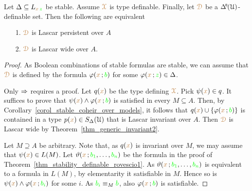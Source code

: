 \begin{corollary}\label{corol_persistent_finsat}
  Let $\Delta\subseteq L_{{\color{brown} x}\,{\color{green} z}}$ be stable.
  Assume ${\color{brown}\EuScript X}$ is type definable.
  Finally, let ${\color{brown}\EuScript D}$ be a $\BDelta(\U)$-definable set.
  Then the following are equivalent 
  \begin{itemize}
    \item[1.] ${\color{brown}\EuScript D}$ is Lascar persistent over $A$
    \item[2.] ${\color{brown}\EuScript D}$ is Lascar wide over $A$. 
  \end{itemize}
\end{corollary}
\begin{proof}
  As Boolean combinations of stable formulas are stable, we can assume that ${\color{brown}\EuScript D}$ is defined by the formula $\varphi({\color{brown} x}\,;{\color{green} b})$ for some $\varphi({\color{brown} x}\,;{\color{green} z})\in\Delta$.

  Only $\Rightarrow$ requires a proof.
  Let $q({\color{brown} x})$ be the type defining ${\color{brown}\EuScript X}$.
  Pick $\psi({\color{brown} x})\in q$.
  It suffices to prove that $\psi({\color{brown} x})\wedge\varphi({\color{brown} x}\,;{\color{green} b})$ is satisfied in every $M\subseteq A$.
  Then, by Corollary~\ref{corol_stable_coheir_over_models}, it follows that $q({\color{brown} x})\cup\{\varphi({\color{brown} x}\,;{\color{green} b})\}$ is contained in a type $p({\color{brown} x})\in S_\Delta(\EuScript U)$ that is Lascar invariant over $A$.
  Then ${\color{brown}\EuScript D}$ is Lascar wide by Theorem~\ref{thm_generic_invariant2}.
  
  Let $M\supseteq A$ be arbitrary.
  Note that, as $q({\color{brown} x})$ is invariant over $M$, we may assume that $\psi({\color{brown} x})\in L(M)$.
  Let $\vartheta({\color{brown} x}\,;{\color{green} b_1},\dots,{\color{green} b_n})$ be the formula in the proof of Theorem~\ref{thm_stability_definable_rovescio1}.
  As $\vartheta({\color{brown} x}\,;{\color{green} b_1},\dots,{\color{green} b_n})$ is equivalent to a formula in $L(M)$, by elementarity it satisfiable in $M$.
  Hence so is $\psi({\color{brown} x})\wedge\varphi({\color{brown} x}\,;{\color{green} b_i})$ for some $i$.
  As ${\color{green} b_i}\equiv_M{\color{green} b}$, also $\varphi({\color{brown} x}\,;{\color{green} b})$ is satisfiable.
\end{proof}


